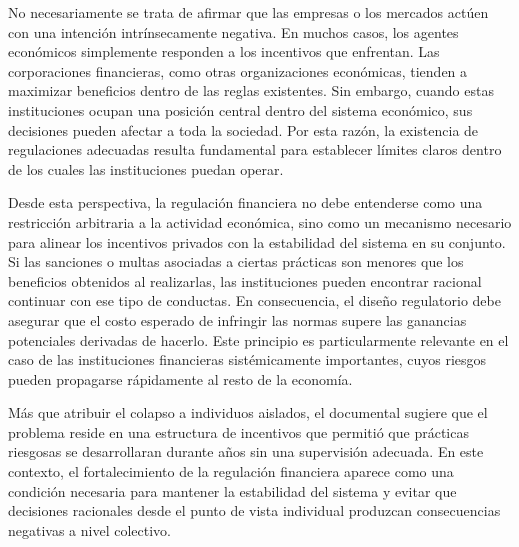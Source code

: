 No necesariamente se trata de afirmar que las empresas o los mercados actúen con una intención intrínsecamente negativa. En muchos casos, los agentes económicos simplemente responden a los incentivos que enfrentan. Las corporaciones financieras, como otras organizaciones económicas, tienden a maximizar beneficios dentro de las reglas existentes. Sin embargo, cuando estas instituciones ocupan una posición central dentro del sistema económico, sus decisiones pueden afectar a toda la sociedad. Por esta razón, la existencia de regulaciones adecuadas resulta fundamental para establecer límites claros dentro de los cuales las instituciones puedan operar.

Desde esta perspectiva, la regulación financiera no debe entenderse como una restricción arbitraria a la actividad económica, sino como un mecanismo necesario para alinear los incentivos privados con la estabilidad del sistema en su conjunto. Si las sanciones o multas asociadas a ciertas prácticas son menores que los beneficios obtenidos al realizarlas, las instituciones pueden encontrar racional continuar con ese tipo de conductas. En consecuencia, el diseño regulatorio debe asegurar que el costo esperado de infringir las normas supere las ganancias potenciales derivadas de hacerlo. Este principio es particularmente relevante en el caso de las instituciones financieras sistémicamente importantes, cuyos riesgos pueden propagarse rápidamente al resto de la economía.

Más que atribuir el colapso a individuos aislados, el documental sugiere que el problema reside en una estructura de incentivos que permitió que prácticas riesgosas se desarrollaran durante años sin una supervisión adecuada. En este contexto, el fortalecimiento de la regulación financiera aparece como una condición necesaria para mantener la estabilidad del sistema y evitar que decisiones racionales desde el punto de vista individual produzcan consecuencias negativas a nivel colectivo.
